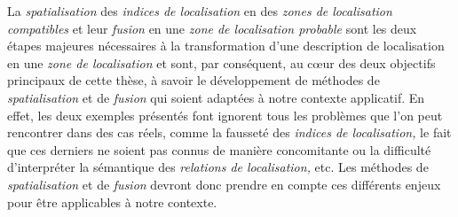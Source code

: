 La \emph{spatialisation} des \emph{indices de localisation} en des
\emph{zones de localisation compatibles} et leur \emph{fusion} en une
\emph{zone de localisation probable} sont les deux étapes majeures
nécessaires à la transformation d'une description de localisation en
une \emph{zone de localisation} et sont, par conséquent, au cœur des
deux objectifs principaux de cette thèse, à savoir le développement de
méthodes de \emph{spatialisation} et de \emph{fusion} qui soient
adaptées à notre contexte applicatif. En effet, les deux exemples
présentés font ignorent tous les problèmes que l'on peut rencontrer
dans des cas réels, comme la fausseté des \emph{indices de
  localisation,} le fait que ces derniers ne soient pas connus de
manière concomitante ou la difficulté d'interpréter la sémantique des
\emph{relations de localisation,} etc. Les méthodes de
\emph{spatialisation} et de \emph{fusion} devront donc prendre en
compte ces différents enjeux pour être applicables à notre contexte.


